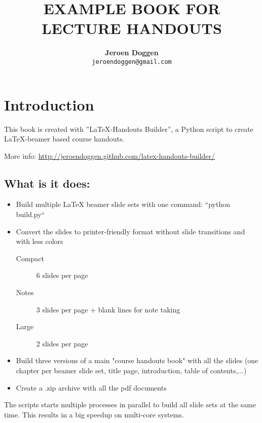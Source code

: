 \documentclass[a4paper]{book}
\title{\LARGE \textbf{\uppercase{ Example Book for Lecture  Handouts}}}
\author{\textbf{Jeroen Doggen}  \\
        \texttt{jeroendoggen@gmail.com}
}
\begin{document}
\maketitle
\tableofcontents

\chapter*{Introduction}
\label{chap_intro}

This book is created with ''\LaTeX -Handouts Builder'', a Python script to create \LaTeX-beamer based course handouts.

\noindent More info: \url{http://jeroendoggen.github.com/latex-handouts-builder/}


\section*{What is it does:}

\begin{itemize}
\item Build multiple LaTeX beamer slide sets with one command: ``python build.py``
\item Convert the slides to printer-friendly format without slide transitions and with less colors
\begin{description}
 \item[Compact] 6 slides per page
 \item[Notes] 3 slides per page + blank lines for note taking
 \item[Large] 2 slides per page
\end{description}
\item Build three versions of a main "course handouts book" with all the slides (one chapter per beamer slide set, title page, introduction, table of contents,...)
\item Create a .zip archive with all the pdf documents
\end{itemize}

\noindent The scripts starts multiple processes in parallel to build all slide sets at the same time. This results in a big speedup on multi-core systems.
\end{document}
